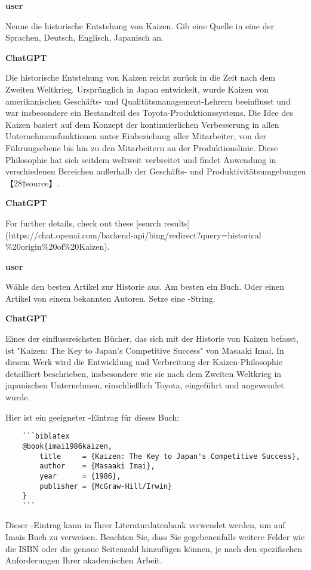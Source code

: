 \textbf{user}

Nenne die historische Entstehung von Kaizen. Gib eine Quelle in eine der Sprachen, Deutsch, Englisch, Japanisch an.

\textbf{ChatGPT}

Die historische Entstehung von Kaizen reicht zurück in die Zeit nach dem Zweiten Weltkrieg. Ursprünglich in Japan entwickelt, wurde Kaizen von amerikanischen Geschäfts- und Qualitätsmanagement-Lehrern beeinflusst und war insbesondere ein Bestandteil des Toyota-Produktionssystems. Die Idee des Kaizen basiert auf dem Konzept der kontinuierlichen Verbesserung in allen Unternehmensfunktionen unter Einbeziehung aller Mitarbeiter, von der Führungsebene bis hin zu den Mitarbeitern an der Produktionslinie. Diese Philosophie hat sich seitdem weltweit verbreitet und findet Anwendung in verschiedenen Bereichen außerhalb der Geschäfts- und Produktivitätsumgebungen【28†source】.

\textbf{ChatGPT}

For further details, check out these [search results](https://chat.openai.com/backend-api/bing/redirect?query=historical
\%20origin\%20of\%20Kaizen).

\textbf{user}

Wähle den besten Artikel zur Historie aus. Am besten ein Buch. Oder einen Artikel von einem bekannten Autoren. Setze eine \BibTeX{}-String.

\textbf{ChatGPT}

Eines der einflussreichsten Bücher, das sich mit der Historie von Kaizen befasst, ist "Kaizen: The Key to Japan's Competitive Success" von Masaaki Imai. In diesem Werk wird die Entwicklung und Verbreitung der Kaizen-Philosophie detailliert beschrieben, insbesondere wie sie nach dem Zweiten Weltkrieg in japanischen Unternehmen, einschließlich Toyota, eingeführt und angewendet wurde.

Hier ist ein geeigneter \BibTeX{}-Eintrag für dieses Buch:

\begin{verbatim}
	```biblatex
	@book{imai1986kaizen,
		title     = {Kaizen: The Key to Japan's Competitive Success},
		author    = {Masaaki Imai},
		year      = {1986},
		publisher = {McGraw-Hill/Irwin}
	}
	```
\end{verbatim}

Dieser \BibTeX{}-Eintrag kann in Ihrer Literaturdatenbank verwendet werden, um auf Imais Buch zu verweisen. Beachten Sie, dass Sie gegebenenfalls weitere Felder wie die ISBN oder die genaue Seitenzahl hinzufügen können, je nach den spezifischen Anforderungen Ihrer akademischen Arbeit.

